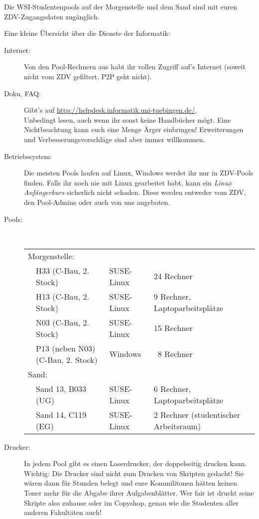 
Die WSI-Studentenpools auf der Morgenstelle und dem Sand sind
  mit euren ZDV-Zugangsdaten zugänglich.

Eine kleine Übersicht über die Dienste der Informatik:

\begin{description}

  \item[Internet:]
    Von den Pool-Rechnern aus habt ihr vollen Zugriff auf's Internet (soweit
    nicht vom ZDV gefiltert, P2P geht nicht).

  \item[Doku, FAQ:]
    Gibt's auf \url{http://helpdesk.informatik.uni-tuebingen.de/}.\\
    Unbedingt lesen, auch wenn ihr sonst keine Handbücher mögt. Eine
    Nichtbeachtung kann euch eine Menge Ärger einbringen! Erweiterungen und
    Ver\-bes\-ser\-ungs\-vor\-schläge sind aber immer willkommen.

  \item[Betriebssystem:]
    Die meisten Pools laufen auf Linux, Windows werdet ihr nur in ZDV-Pools finden. Falls ihr noch nie mit Linux gearbeitet habt, 
    kann ein \textit{Linux Anfängerkurs} sicherlich nicht schaden. Diese werden entweder vom ZDV, den Pool-Admins oder auch von uns angeboten.

  \item[Pools:] ~\\
    \begin{tabular}{llll}
    \multicolumn{3}{l}{Morgenstelle:} \\
    & H33 (C-Bau, 2. Stock) &  SUSE-Linux & 24 Rechner\\
    & H13 (C-Bau, 2. Stock) &  SUSE-Linux & 9 Rechner, Laptoparbeitsplätze\\
    & N03 (C-Bau, 2. Stock) &  SUSE-Linux & 15 Rechner\\
    & P13 (neben N03) (C-Bau, 2. Stock) &  Windows & ~8 Rechner\\

    \multicolumn{3}{l}{Sand:} \\
    &  Sand 13, B033 (UG) & SUSE-Linux & 6 Rechner, Laptoparbeitsplätze\\
    &  Sand 14, C119 (EG) & SUSE-Linux & 2 Rechner (studentischer Arbeitsraum)
    \end{tabular}

  \item[Drucker:]
     In jedem Pool gibt es einen Laserdrucker, der doppelseitig drucken kann.
     Wichtig: Die Drucker sind nicht zum Drucken
     von Skripten gedacht! Sie wären dann für Stunden belegt und eure
     Kommilitonen hätten keinen Toner mehr für die Abgabe ihrer Aufgabenblätter.
     Wer fair ist druckt seine Skripte also zuhause oder im Copyshop, genau wie
     die Studenten aller anderen Fakultäten auch!


\end{description}
